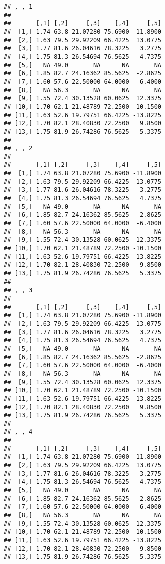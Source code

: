 \documentclass[]{article}
\begin{document}
\begin{verbatim}
## , , 1
## 
##       [,1] [,2]     [,3]    [,4]     [,5]
##  [1,] 1.74 63.8 21.07280 75.6900 -11.8900
##  [2,] 1.63 79.5 29.92209 66.4225  13.0775
##  [3,] 1.77 81.6 26.04616 78.3225   3.2775
##  [4,] 1.75 81.3 26.54694 76.5625   4.7375
##  [5,]   NA 49.0       NA      NA       NA
##  [6,] 1.85 82.7 24.16362 85.5625  -2.8625
##  [7,] 1.60 57.6 22.50000 64.0000  -6.4000
##  [8,]   NA 56.3       NA      NA       NA
##  [9,] 1.55 72.4 30.13528 60.0625  12.3375
## [10,] 1.70 62.1 21.48789 72.2500 -10.1500
## [11,] 1.63 52.6 19.79751 66.4225 -13.8225
## [12,] 1.70 82.1 28.40830 72.2500   9.8500
## [13,] 1.75 81.9 26.74286 76.5625   5.3375
## 
## , , 2
## 
##       [,1] [,2]     [,3]    [,4]     [,5]
##  [1,] 1.74 63.8 21.07280 75.6900 -11.8900
##  [2,] 1.63 79.5 29.92209 66.4225  13.0775
##  [3,] 1.77 81.6 26.04616 78.3225   3.2775
##  [4,] 1.75 81.3 26.54694 76.5625   4.7375
##  [5,]   NA 49.0       NA      NA       NA
##  [6,] 1.85 82.7 24.16362 85.5625  -2.8625
##  [7,] 1.60 57.6 22.50000 64.0000  -6.4000
##  [8,]   NA 56.3       NA      NA       NA
##  [9,] 1.55 72.4 30.13528 60.0625  12.3375
## [10,] 1.70 62.1 21.48789 72.2500 -10.1500
## [11,] 1.63 52.6 19.79751 66.4225 -13.8225
## [12,] 1.70 82.1 28.40830 72.2500   9.8500
## [13,] 1.75 81.9 26.74286 76.5625   5.3375
## 
## , , 3
## 
##       [,1] [,2]     [,3]    [,4]     [,5]
##  [1,] 1.74 63.8 21.07280 75.6900 -11.8900
##  [2,] 1.63 79.5 29.92209 66.4225  13.0775
##  [3,] 1.77 81.6 26.04616 78.3225   3.2775
##  [4,] 1.75 81.3 26.54694 76.5625   4.7375
##  [5,]   NA 49.0       NA      NA       NA
##  [6,] 1.85 82.7 24.16362 85.5625  -2.8625
##  [7,] 1.60 57.6 22.50000 64.0000  -6.4000
##  [8,]   NA 56.3       NA      NA       NA
##  [9,] 1.55 72.4 30.13528 60.0625  12.3375
## [10,] 1.70 62.1 21.48789 72.2500 -10.1500
## [11,] 1.63 52.6 19.79751 66.4225 -13.8225
## [12,] 1.70 82.1 28.40830 72.2500   9.8500
## [13,] 1.75 81.9 26.74286 76.5625   5.3375
## 
## , , 4
## 
##       [,1] [,2]     [,3]    [,4]     [,5]
##  [1,] 1.74 63.8 21.07280 75.6900 -11.8900
##  [2,] 1.63 79.5 29.92209 66.4225  13.0775
##  [3,] 1.77 81.6 26.04616 78.3225   3.2775
##  [4,] 1.75 81.3 26.54694 76.5625   4.7375
##  [5,]   NA 49.0       NA      NA       NA
##  [6,] 1.85 82.7 24.16362 85.5625  -2.8625
##  [7,] 1.60 57.6 22.50000 64.0000  -6.4000
##  [8,]   NA 56.3       NA      NA       NA
##  [9,] 1.55 72.4 30.13528 60.0625  12.3375
## [10,] 1.70 62.1 21.48789 72.2500 -10.1500
## [11,] 1.63 52.6 19.79751 66.4225 -13.8225
## [12,] 1.70 82.1 28.40830 72.2500   9.8500
## [13,] 1.75 81.9 26.74286 76.5625   5.3375

\end{verbatim}
\end{document}
